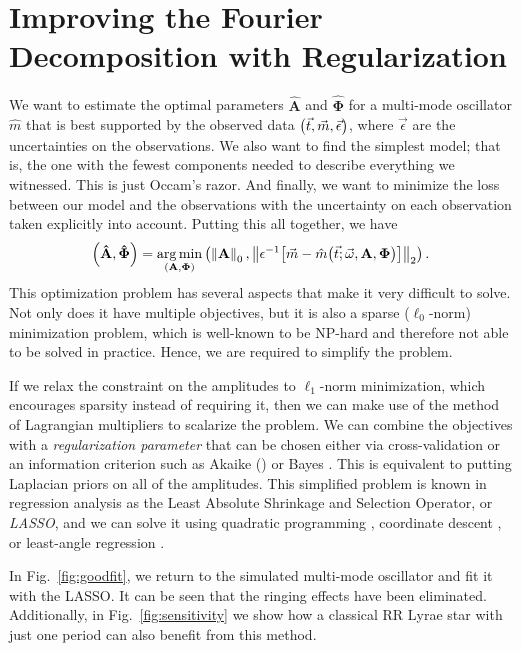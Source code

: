 \documentclass[11pt,twoside]{book}
\begin{document}
\section{Improving the Fourier Decomposition with Regularization}
We want to estimate the optimal parameters $\mathbf {\hat A}$ and $\boldsymbol{\hat \Phi}$ for a multi-mode oscillator $\hat m$ that is best supported by the observed data $\qty(\vec t, \vec m, \vec \epsilon)$, where $\vec \epsilon$ are the uncertainties on the observations. We also want to find the simplest model; that is, the one with the fewest components needed to describe everything we witnessed. This is just Occam's razor. And finally, we want to minimize the loss between our model and the observations with the uncertainty on each observation taken explicitly into account. Putting this all together, we have
\begin{equation}
    \qty(\mathbf {\hat A}, \boldsymbol{\hat \Phi}) =
      \underset{\qty(\mathbf A, \boldsymbol \Phi)}{\arg\min} 
      \left(\left\|\mathbf{A} \right\|_0,
            \left\| \epsilon^{-1}\qty[\vec m - \hat m\qty(\vec t ; {\vec \omega}, \mathbf{A}, \boldsymbol{\Phi})]\right\|_2
      \right). 
\end{equation}
This optimization problem has several aspects that make it very difficult to solve. Not only does it have multiple objectives, but it is also a sparse ($\ell_0$-norm) minimization problem, which is well-known to be NP-hard and therefore not able to be solved in practice. Hence, we are required to simplify the problem. 

If we relax the constraint on the amplitudes to $\ell_1$-norm minimization, which encourages sparsity instead of requiring it, then we can make use of the method of Lagrangian multipliers to scalarize the problem. We can combine the objectives with a \emph{regularization parameter} that can be chosen either via cross-validation or an information criterion such as Akaike (\citeyear{akaike1974new}) or Bayes \citep{schwarz1978estimating}. This is equivalent to putting Laplacian priors on all of the amplitudes. This simplified problem is known in regression analysis as the Least Absolute Shrinkage and Selection Operator, or \emph{LASSO}, and we can solve it using quadratic programming \citep{tibshirani1996regression}, coordinate descent \citep{fu1998penalized}, or least-angle regression \citep{efron2004least}. 

In Fig.~\ref{fig:goodfit}, we return to the simulated multi-mode oscillator and fit it with the LASSO. It can be seen that the ringing effects have been eliminated. Additionally, in Fig.~\ref{fig:sensitivity} we show how a classical RR Lyrae star with just one period can also benefit from this method.
\end{document}
